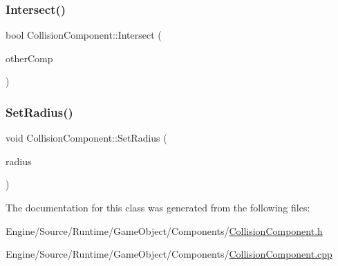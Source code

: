 \subsubsection{\texorpdfstring{Intersect()}{Intersect()}}
{\footnotesize\ttfamily bool Collision\+Component\+::\+Intersect (\begin{DoxyParamCaption}\item[{const \mbox{\hyperlink{class_collision_component}{Collision\+Component}} \&}]{other\+Comp }\end{DoxyParamCaption})}

\mbox{\label{class_collision_component_a4bd86e9646160a141aed8a40704ad5fd}} 
\subsubsection{\texorpdfstring{Set\+Radius()}{SetRadius()}}
{\footnotesize\ttfamily void Collision\+Component\+::\+Set\+Radius (\begin{DoxyParamCaption}\item[{float}]{radius }\end{DoxyParamCaption})}



The documentation for this class was generated from the following files\+:\begin{DoxyCompactItemize}
\item 
Engine/\+Source/\+Runtime/\+Game\+Object/\+Components/\mbox{\hyperlink{_collision_component_8h}{Collision\+Component.\+h}}\item 
Engine/\+Source/\+Runtime/\+Game\+Object/\+Components/\mbox{\hyperlink{_collision_component_8cpp}{Collision\+Component.\+cpp}}\end{DoxyCompactItemize}
